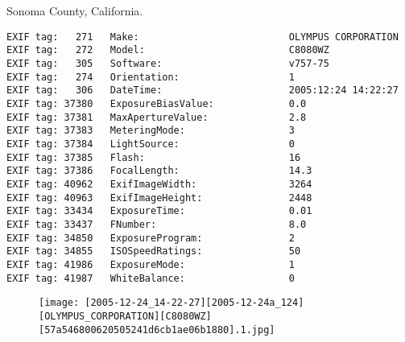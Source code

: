 \section{\protect{}}
\noindent Sonoma County, California.
\noindent
\begin{lstlisting}
EXIF tag:   271   Make:                          OLYMPUS CORPORATION
EXIF tag:   272   Model:                         C8080WZ
EXIF tag:   305   Software:                      v757-75
EXIF tag:   274   Orientation:                   1
EXIF tag:   306   DateTime:                      2005:12:24 14:22:27
EXIF tag: 37380   ExposureBiasValue:             0.0
EXIF tag: 37381   MaxApertureValue:              2.8
EXIF tag: 37383   MeteringMode:                  3
EXIF tag: 37384   LightSource:                   0
EXIF tag: 37385   Flash:                         16
EXIF tag: 37386   FocalLength:                   14.3
EXIF tag: 40962   ExifImageWidth:                3264
EXIF tag: 40963   ExifImageHeight:               2448
EXIF tag: 33434   ExposureTime:                  0.01
EXIF tag: 33437   FNumber:                       8.0
EXIF tag: 34850   ExposureProgram:               2
EXIF tag: 34855   ISOSpeedRatings:               50
EXIF tag: 41986   ExposureMode:                  1
EXIF tag: 41987   WhiteBalance:                  0

\end{lstlisting}
\clearpage
\begin{figure}
\raggedleft
\texttt{[image: [2005-12-24\_14-22-27][2005-12-24a\_124][OLYMPUS\_CORPORATION][C8080WZ][57a546800620505241d6cb1ae06b1880].1.jpg]}
\end{figure}


\clearpage
